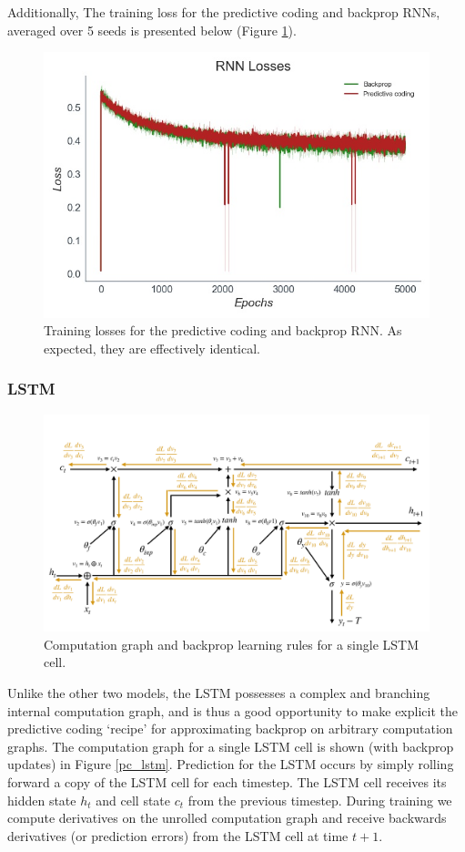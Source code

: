 Additionally, The training loss for the predictive coding and backprop RNNs, averaged over 5 seeds is presented below (Figure \ref{rnn_losses}).

\begin{figure}[ht]
\label{rnn_losses}
  \centering
  \includegraphics[width=.7\linewidth]{chapter_6_figures/RNN_Losses_super_prelim_6.jpg}  
\caption{Training losses for the predictive coding and backprop RNN. As expected, they are effectively identical.}
\end{figure}
\subsubsection{LSTM}
\label{PC_LSTM}

\begin{figure}[ht]
\label{backprop_lstm}
  \centering
  \includegraphics[width=1\linewidth]{chapter_6_figures/backprop_LSTM.pdf}  
\caption{Computation graph and backprop learning rules for a single LSTM cell.}
\end{figure}
Unlike the other two models, the LSTM possesses a complex and branching internal computation graph, and is thus a good opportunity to make explicit the predictive coding `recipe' for approximating backprop on arbitrary computation graphs. The computation graph for a single LSTM cell is shown (with backprop updates) in Figure \ref{pc_lstm}. Prediction for the LSTM occurs by simply rolling forward a copy of the LSTM cell for each timestep. The LSTM cell receives its hidden state $h_t$ and cell state $c_t$ from the previous timestep. During training we compute derivatives on the unrolled computation graph and receive backwards derivatives (or prediction errors) from the LSTM cell at time $t+1$.

